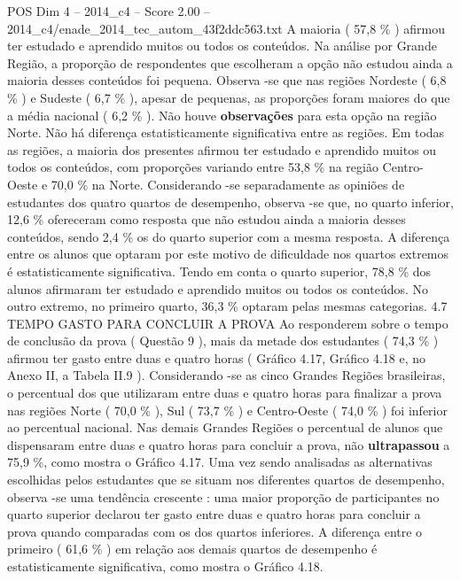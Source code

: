 \begin{textsample}{POS Dim 4 – 2014\_c4 – Score 2.00 – 2014\_c4/enade\_2014\_tec\_autom\_43f2ddc563.txt}
A maioria ( 57,8 \% ) afirmou ter estudado e aprendido muitos ou todos os conteúdos.
Na análise por Grande Região, a proporção de respondentes que escolheram a opção não estudou ainda a maioria desses conteúdos foi pequena.
Observa -se que nas regiões Nordeste ( 6,8 \% ) e Sudeste ( 6,7 \% ), apesar de pequenas, as proporções foram maiores do que a média nacional ( 6,2 \% ).
Não houve \textbf{observações} para esta opção na região Norte.
Não há diferença estatisticamente significativa entre as regiões.
Em todas as regiões, a maioria dos presentes afirmou ter estudado e aprendido muitos ou todos os conteúdos, com proporções variando entre 53,8 \% na região Centro-Oeste e 70,0 \% na Norte.
Considerando -se separadamente as opiniões de estudantes dos quatro quartos de desempenho, observa -se que, no quarto inferior, 12,6 \% ofereceram como resposta que não estudou ainda a maioria desses conteúdos, sendo 2,4 \% os do quarto superior com a mesma resposta.
A diferença entre os alunos que optaram por este motivo de dificuldade nos quartos extremos é estatisticamente significativa.
Tendo em conta o quarto superior, 78,8 \% dos alunos afirmaram ter estudado e aprendido muitos ou todos os conteúdos.
No outro extremo, no primeiro quarto, 36,3 \% optaram pelas mesmas categorias. 4.7 TEMPO GASTO PARA CONCLUIR A PROVA Ao responderem sobre o tempo de conclusão da prova ( Questão 9 ), mais da metade dos estudantes ( 74,3 \% ) afirmou ter gasto entre duas e quatro horas ( Gráfico 4.17, Gráfico 4.18 e, no Anexo II, a Tabela II.9 ).
Considerando -se as cinco Grandes Regiões brasileiras, o percentual dos que utilizaram entre duas e quatro horas para finalizar a prova nas regiões Norte ( 70,0 \% ), Sul ( 73,7 \% ) e Centro-Oeste ( 74,0 \% ) foi inferior ao percentual nacional.
Nas demais Grandes Regiões o percentual de alunos que dispensaram entre duas e quatro horas para concluir a prova, não \textbf{ultrapassou} a 75,9 \%, como mostra o Gráfico 4.17.
Uma vez sendo analisadas as alternativas escolhidas pelos estudantes que se situam nos diferentes quartos de desempenho, observa -se uma tendência crescente : uma maior proporção de participantes no quarto superior declarou ter gasto entre duas e quatro horas para concluir a prova quando comparadas com os dos quartos inferiores.
A diferença entre o primeiro ( 61,6 \% ) em relação aos demais quartos de desempenho é estatisticamente significativa, como mostra o Gráfico 4.18.

\end{textsample}
